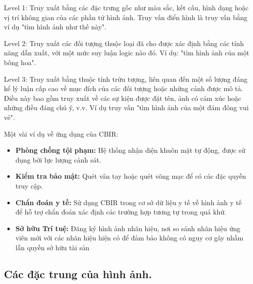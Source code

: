 \documentclass[a4paper,14pt]{extreport}
\begin{document}
 Level 1: Truy xuất bằng các đặc trưng gốc như màu sắc, kết cấu, hình dạng hoặc vị trí không gian của các phần tử hình ảnh. Truy vấn điển hình là truy vấn bằng ví dụ "tìm hình ảnh như thế này". 
 \par
 Level 2: Truy xuất các đối tượng thuộc loại đã cho được xác định bằng các tính năng dẫn xuất, với một mức suy luận logic nào đó. Ví dụ: "tìm hình ảnh của một bông hoa".
 \par
 Level 3: Truy xuất bằng thuộc tính trừu tượng, liên quan đến một số lượng đáng kể lý luận cấp cao về mục đích của các đối tượng hoặc những cảnh được mô tả. Điều này bao gồm truy xuất về các sự kiện được đặt tên, ảnh có cảm xúc hoặc những điều đáng chú ý, v.v. Ví dụ truy vấn "tìm hình ảnh của một đám đông vui vẻ".
 
Một vài ví dụ về  ứng dụng của CBIR: \cite{features}
\begin{itemize}
    \item \textbf{Phòng chống tội phạm:} Hệ thống nhận diện khuôn mặt tự động, được sử dụng bởi lực lượng cảnh sát.
    \item \textbf{Kiểm tra bảo mật:} Quét vân tay hoặc quét võng mạc để có các đặc quyền truy cập.
    \item \textbf{Chẩn đoán y tế:} Sử dụng CBIR trong cơ sở dữ liệu y tế về hình ảnh y tế để hỗ trợ chẩn đoán xác định các trường hợp tương tự trong quá khứ.
    \item \textbf{Sở hữu Trí tuệ:} Đăng ký hình ảnh nhãn hiệu, nơi so sánh nhãn hiệu ứng viên mới với các nhãn hiệu hiện có để đảm bảo không có nguy cơ gây nhầm lẫn quyền sở hữu tài sản
\end{itemize}
\subsection{Các đặc trung của hình ảnh.}
\end{document}
